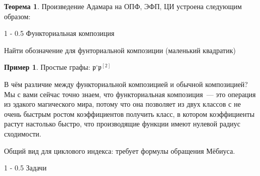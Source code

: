 \documentclass{article}
\makeatletter
\theoremstyle{definition}
\newtheorem{example}{Пример}
\newtheorem*{theorem}{Теорема}
\renewcommand{\section}{\@startsection
{section}%
{1}%
{\z@}%
{-\baselineskip}%
{0.5\baselineskip}%
{\centering\large\scshape}} %
\renewcommand{\subsection}{\@startsection
{subsection}%
{1}%
{\z@}%
{-\baselineskip}%
{0.5\baselineskip}%
{\centering\large\scshape}} %
\makeatother
\begin{document}
\begin{theorem}
	Произведение Адамара на ОПФ, ЭФП, ЦИ устроена следующим образом:
\end{theorem}

\subsection{Функториальная композиция}

Найти обозначение для фунториальной композиции (маленький квадратик)

\begin{example}
	Простые графы: \( \mathfrak p {}^\square \mathfrak p^{[2]}  \)
\end{example}

В чём различие между функториальной композицией и обычной композицией? Мы с вами
сейчас точно знаем, что функториальная композиция~--- это операция из эдакого
магического мира, потому что она позволяет из двух классов с не очень быстрым
ростом коэффициентов получить класс, в котором коэффициенты растут настолько
быстро, что производящие функции имеют нулевой радиус сходимости.

Общий вид для циклового индекса: требует формулы обращения Мёбиуса.


\section{Задачи}
\end{document}
